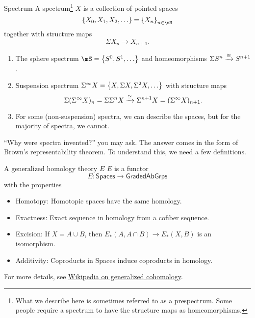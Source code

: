 \begin{definition}{Spectrum}{}
    A {spectrum}\footnote{What we describe here is sometimes referred to as a prespectrum. Some people require a spectrum to have the structure maps as homeomorphisms.} $X$ is a collection of pointed spaces $$\sets{X_0,X_1,X_2,\dots} = \sets{X_n}_{n\in \mN}$$ together with structure maps $$\Sigma X_n\to X_{n+1}.$$
\end{definition}
\begin{example}{}{}
    \begin{enumerate}
        \item The sphere spectrum $\mS = \sets{S^0,S^1,\dots}$ and homeomorphisms $\Sigma S^n\xrightarrow{\cong}S^{n+1}$. 
        \item Suspension spectrum $\Sigma^\infty X = \sets{X,\Sigma X, \Sigma^2 X,\dots}$  with structure maps $$\Sigma (\Sigma^\infty X)_n = \Sigma \Sigma^n X\xrightarrow{\cong }\Sigma^{n+1}X = (\Sigma^\infty X)_{n+1}.$$
        \item For some (non-suspension) spectra, we can describe the spaces, but for the majority of spectra, we cannot. 
    \end{enumerate}
\end{example}
\begin{center}
  \end{center}

``Why were spectra invented?'' you may ask. The answer comes in the form of Brown's representability theorem. To understand this, we need a few definitions. 
\begin{definition}{}{}
    A generalized homology theory $E$ $E$ is a functor $$E:\mathsf{Spaces}\to \mathsf{GradedAbGrps}$$ with the properties 
    \begin{itemize}
        \item Homotopy: Homotopic spaces have the same homology.
        \item Exactness: Exact sequence in homology from a cofiber sequence. 
        \item Excision: If $X = A\cup B$, then $E_\ast(A,A\cap B)\to E_\ast(X,B)$ is an isomorphism. 
        \item Additivity: Coproducts in Spaces induce coproducts in homology.
    \end{itemize}
    For more details, see \href{https://en.wikipedia.org/wiki/Cohomology#Axioms_and_generalized_cohomology_theories}{Wikipedia on generalized cohomology}.
\end{definition}

